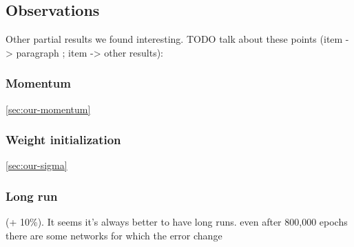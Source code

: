 
\subsection{Observations}
\label{sec:results-two-lambdas}  %

Other partial results we found interesting. 
TODO talk about these points (item -> paragraph ; item -> other results): 

\subsubsection{Momentum}
\label{sec:results-momentum} 

\ref{sec:our-momentum} 

\subsubsection{Weight initialization}
\label{sec:results-sigma} 

\ref{sec:our-sigma} 

\subsubsection{Long run} 
\label{sec:results-long-run} 

(+ 10\%). It seems it's always better to have long runs. even after 800,000 epochs there are some networks for which the error change


 
